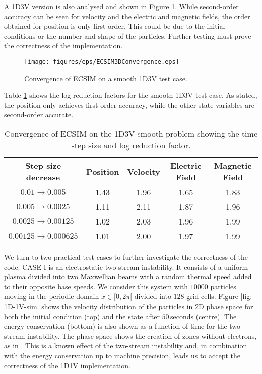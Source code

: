 A 1D3V version is also analysed and shown in Figure \ref{fig: 1D-3V-convergence}. While second-order accuracy can be seen for velocity and the electric and magnetic fields, the order obtained for position is only first-order. This could be due to the initial conditions or the number and shape of the particles. Further testing must prove the correctness of the implementation.
\begin{figure}[h]
    \centering
    \texttt{[image: figures/eps/ECSIM3DConvergence.eps]}
    \caption{Convergence of ECSIM on a smooth 1D3V test case.}
    \label{fig: 1D-3V-convergence}
\end{figure}
Table \ref{tab: 1D3V-convergence} shows the log reduction factors for the smooth 1D3V test case. As stated, the position only achieves first-order accuracy, while the other state variables are second-order accurate.
\begin{table}[h!]
\centering
\begin{tabular}{ccccc}
\toprule
\textbf{Step size decrease} & \textbf{Position}& \textbf{Velocity} & \textbf{Electric Field} & \textbf{Magnetic Field}\\
\midrule
$0.01 \rightarrow 0.005$ & 1.43  & 1.96 & 1.65&1.83 \\
$0.005\rightarrow0.0025$ & 1.11 & 2.11 & 1.87&1.96\\
$0.0025\rightarrow0.00125$ & 1.02 & 2.03 & 1.96&1.99\\
$0.00125\rightarrow0.000625$ & 1.01& 2.00&1.97&1.99\\
\bottomrule
\end{tabular}
\caption{Convergence of ECSIM on the 1D3V smooth problem showing the time step size and log reduction factor.}
\label{tab: 1D3V-convergence}
\end{table}
 
 
We turn to two practical test cases to further investigate the correctness of the code. CASE I is an electrostatic two-stream instability. It consists of a uniform plasma divided into two Maxwellian beams with a random thermal speed added to their opposite base speeds. We consider this system with $10000$ particles moving in the periodic domain $x \in [0, 2\pi[$ divided into $128$ grid cells. 
 Figure \ref{fig: 1D-1V-sim} shows the velocity distribution of the particles in 2D phase space for both the initial condition (top) and the state after $50$\,seconds (centre). The energy conservation (bottom) is also shown as a function of time for the two-stream instability. The phase space shows the creation of zones without electrons, as in \cite{lapenta_advances_2023}. This is a known effect of the two-stream instability and, in combination with the energy conservation up to machine precision, leads us to accept the correctness of the 1D1V implementation.

